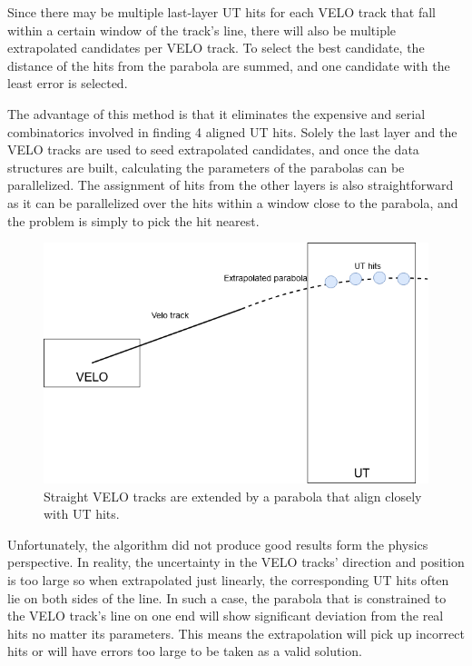 \documentclass[12pt]{article}
\begin{document}
Since there may be multiple last-layer UT hits for each VELO track that fall within a certain window of the track's line, there will also be multiple extrapolated candidates per VELO track. To select the best candidate, the distance of the hits from the parabola are summed, and one candidate with the least error is selected.

The advantage of this method is that it eliminates the expensive and serial combinatorics involved in finding 4 aligned UT hits. Solely the last layer and the VELO tracks are used to seed extrapolated candidates, and once the data structures are built, calculating the parameters of the parabolas can be parallelized. The assignment of hits from the other layers is also straightforward as it can be parallelized over the hits within a window close to the parabola, and the problem is simply to pick the hit nearest.

\begin{figure}[H]
	\begin{center}
		\includegraphics[width=.75\textwidth]{velout_parabola_fit}
	\end{center}
	\caption{Straight VELO tracks are extended by a parabola that align closely with UT hits.}
	\label{fig_velout_parabola_fit}
\end{figure}


Unfortunately, the algorithm did not produce good results form the physics perspective. In reality, the uncertainty in the VELO tracks' direction and position is too large so when extrapolated just linearly, the corresponding UT hits often lie on both sides of the line. In such a case, the parabola that is constrained to the VELO track's line on one end will show significant deviation from the real hits no matter its parameters. This means the extrapolation will pick up incorrect hits or will have errors too large to be taken as a valid solution.
\end{document}
